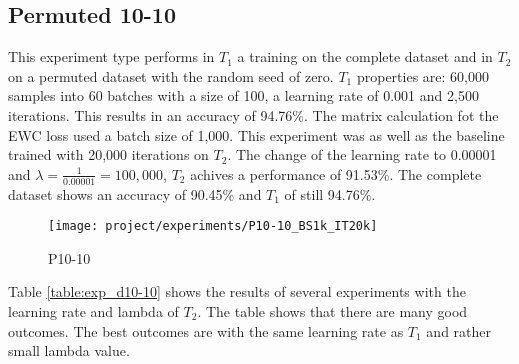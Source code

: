 \newpage

\subsection{Permuted 10-10}

This experiment type performs in $T_1$ a training on the complete dataset and in $T_2$ on a permuted dataset with the random seed of zero.
\newline
$T_1$ properties are: 60,000 samples into 60 batches with a size of 100, a learning rate of 0.001 and 2,500 iterations.
This results in an accuracy of 94.76\%.
The matrix calculation fot the EWC loss used a batch size of 1,000.
\newline
This experiment was as well as the baseline trained with 20,000 iterations on $T_2$.
The change of the learning rate to 0.00001 and $\lambda = \frac{1}{0.00001} = 100,000$, $T_2$ achives a performance of 91.53\%.
The complete dataset shows an accuracy of 90.45\% and $T_1$ of still 94.76\%.

\begin{figure}[H]
    \centering
    \texttt{[image: project/experiments/P10-10\_BS1k\_IT20k]}
    \caption{P10-10}
    \label{fig:exp_p10-10}
\end{figure}

\newpage

Table \ref{table:exp_d10-10} shows the results of several experiments with the learning rate and lambda of $T_2$.
The table shows that there are many good outcomes.
The best outcomes are with the same learning rate as $T_1$ and rather small lambda value.


